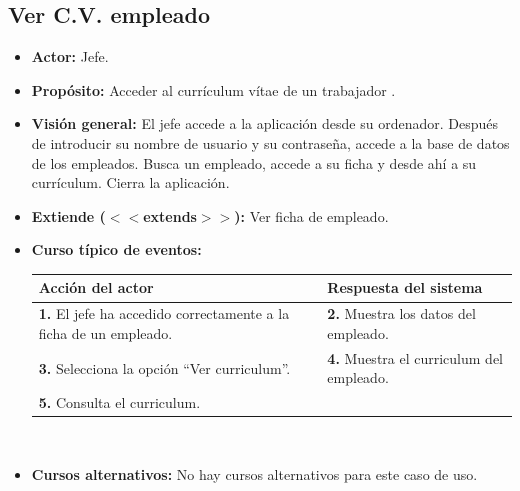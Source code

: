 \documentclass[spanish,a4paper,11pt, twoside]{report}	%
\begin{document}
	\subsection{Ver C.V. empleado}		
			\begin{itemize}
			\item \textbf{Actor:} Jefe.
			\item \textbf{Propósito:} Acceder al currículum vítae de un trabajador  .
			\item \textbf{Visión general:} El jefe accede a la aplicación desde su
				ordenador. Después de introducir su nombre de usuario y su contraseña, accede a
				la base de datos de los empleados. Busca un empleado, accede a su ficha y desde
				ahí a su currículum. Cierra la aplicación.
			\item \textbf{Extiende ($<<$extends$>>$):} Ver ficha de empleado.
			\item \textbf{Curso típico de eventos:} 	\\
				\begin{tabular}{|p{6cm}||p{6cm}|}
				\hline
				\textbf{Acción del actor} & \textbf{Respuesta del sistema} \\ \hline \hline
				\textbf{1.} El jefe ha accedido correctamente a la ficha de un empleado. & 
				\textbf{2.} Muestra los datos del empleado.\\ \hline
				\textbf{3.} Selecciona la opción ``Ver curriculum''.	& 
				\textbf{4.} Muestra el curriculum del empleado. \\ \hline
				\textbf{5.} Consulta el curriculum. & \textbf{} \\ \hline
			\end{tabular}
			\\
			\item \textbf{Cursos alternativos:} No hay cursos alternativos para este caso de uso.
		\end{itemize}



\end{document}

